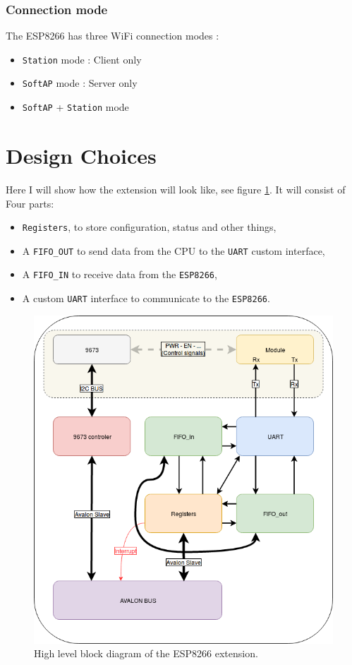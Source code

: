 \documentclass[11pt]{article}
\begin{document}
\subsubsection{Connection mode}
The ESP8266 has three WiFi connection modes :
\begin{itemize}
    \item \texttt{Station} mode : Client only
    \item \texttt{SoftAP} mode : Server only
    \item \texttt{SoftAP} + \texttt{Station} mode
\end{itemize}

\section{Design Choices}
Here I will show how the extension will look like, see figure \ref{high_level}. It will consist of Four parts:
\begin{itemize}
    \item \texttt{Registers}, to store configuration, status and other things,
    \item A \texttt{FIFO\_OUT} to send data from the CPU to the \texttt{UART} custom interface,
    \item A \texttt{FIFO\_IN} to receive data from the \texttt{ESP8266},
    \item A custom \texttt{UART} interface to communicate to the \texttt{ESP8266}.
\end{itemize}
\begin{figure}[H]
    \includegraphics[width=\linewidth]{highlevel.png}
    \caption{High level block diagram of the ESP8266 extension.}
    \label{high_level}
\end{figure}
\end{document}
